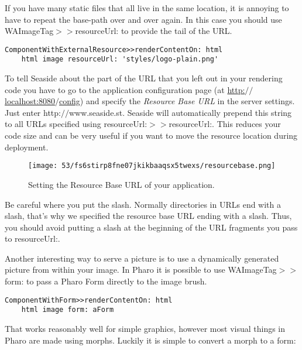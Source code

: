\documentclass[a4paper,10pt,twoside]{book}
\newcommand{\ct}[1]{{\small\ttfamily\textup{#1}}}
\begin{document}
  
If you have many static files that all live in the same location, it is annoying to have to repeat the base-path over and over again. In this case you should use  \ct{WAImageTag$>$$>$resourceUrl:} to provide the tail of the URL.

\begin{lstlisting}
ComponentWithExternalResource>>renderContentOn: html
    html image resourceUrl: 'styles/logo-plain.png'
\end{lstlisting}

To tell Seaside about the part of the URL that you left out in your rendering code you have to go to the application configuration page (at \href{http://localhost:8080/config}{http:$/$$/$localhost:8080$/$config}) and specify the \textit{Resource Base URL} in the server settings. Just enter \ct{http:$/$$/$www.seaside.st}. Seaside will automatically prepend this string to all URLs specified using  \ct{resourceUrl:$>$$>$resourceUrl:}. This reduces your code size and can be very useful if you want to move the resource location during deployment.

\begin{figure}[h!tbp]
	\begin{center}
		\texttt{[image: 53/fs6stirp8fne07jkikbaaqsx5twexs/resourcebase.png]}
		\caption{Setting the Resource Base URL of your  application.\label{book:inaction:servingfiles:images:resourcebaseurl}}
	\end{center}
\end{figure}


Be careful where you put the slash. Normally directories in URLs end with a slash, that's why we specified the resource base URL ending with a slash. Thus, you should avoid putting a slash at the beginning of the URL fragments you pass to \ct{resourceUrl:}.

Another interesting way to serve a picture is to use a dynamically generated picture from within your image. In Pharo it is possible to use  \ct{WAImageTag$>$$>$form:} to pass a Pharo  \ct{Form} directly to the image brush.

\begin{lstlisting}
ComponentWithForm>>renderContentOn: html
    html image form: aForm
\end{lstlisting}

That works reasonably well for simple graphics, however most visual things in Pharo are made using morphs. Luckily it is simple to convert a morph to a form:
\end{document}
